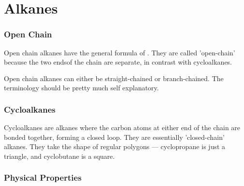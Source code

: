

\pagebreak
\hypertarget{ChapterAlkanes}{}
\part{Alkanes}

	\section{Open Chain}

		Open chain alkanes have the general formula of . They are called 'open-chain' because
		the two endsof the chain are separate, in contrast with cycloalkanes.

		Open chain alkanes can either be straight-chained or branch-chained. The terminology should be pretty much
		self explanatory.





	\section{Cycloalkanes}

		Cycloalkanes are alkanes where the carbon atoms at either end of the chain are bonded together, forming a closed loop.
		They are essentially 'closed-chain' alkanes. They take the shape of regular polygons –– cyclopropane is just a triangle,
		and cyclobutane is a square.




	\pagebreak
	\section{Physical Properties}
